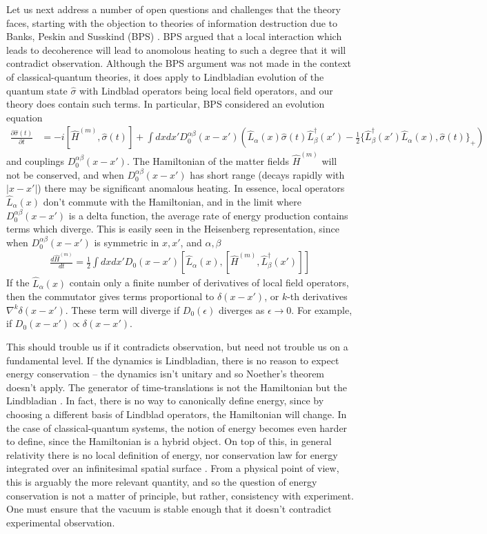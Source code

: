 \documentclass[aps,pra,showpacs,citeautoscript,amsmath,amssymb,floatfix,superscriptaddress,bbm, verbatim,amsfonts,changes,11pt,nofootinbib,longbibliography]{revtex4-2}
\def\L{{\hat{L}}}
\def\qmatterham{\hat{H}^{(m)}}
\def\ab{^{\alpha\beta}}
\def\lax{{\L_\alpha(x)}}
\def\lbxp{{\L^\dagger_\beta(x')}}
\begin{document}
Let us next address a number of open questions and challenges that the theory faces, starting with the objection to theories of information destruction due to Banks, Peskin and Susskind\label{par:bps} (BPS) \cite{bps}. BPS argued
that a local interaction which leads to decoherence will 
lead to anomolous heating to such a degree that it will contradict observation. Although the BPS argument was not made in the context of classical-quantum theories, it does apply to Lindbladian evolution of the quantum state $\hat{\sigma}$ with Lindblad operators being local field operators, and our theory does contain such terms. In particular, BPS considered an evolution equation
\begin{align}
\frac{\partial\hat{\sigma}(t)}{\partial t}
&=-i[\qmatterham,\hat{\sigma}(t)]
+ \int dxdx'
D_0\ab(x-x')\left( 
\L_{\alpha}(x)\hat{\sigma}(t)\L_{\beta}^\dagger(x')
-
\frac{1}{2}\{\lbxp\lax,\hat{\sigma}(t)\}_+ \right)  
\end{align}
 and couplings $D_0\ab(x-x')$.
The Hamiltonian of the matter fields $\qmatterham$ will not be conserved, and when $D_0\ab(x-x')$ has short range (decays rapidly with $|x-x'|$) there may be significant anomalous heating. In essence, local operators $\L_{\alpha}(x)$ don't commute with the Hamiltonian, and in the limit where $D_0\ab(x-x')$ is a delta function, the average rate of energy production contains terms which diverge. This is easily seen in the Heisenberg representation, since when $D_0\ab(x-x')$ is symmetric in $x,x'$, and $\alpha,\beta$ 
\begin{align}
\frac{d{\qmatterham}}{dt} =\frac{1}{2}\int dx dx' D_0(x-x')[\L_{\alpha}(x),[\qmatterham,\L^\dagger_\beta(x')]]
\label{eq:heating}
\end{align} 
If the $\L_{\alpha}(x)$ contain only a finite number of derivatives of local field operators, then the commutator gives terms proportional to $\delta(x-x')$, or $k$-th derivatives $\nabla^k\delta(x-x')$. These term will diverge if $D_0(\epsilon)$ diverges as $\epsilon\rightarrow 0$. For example, if $D_0(x-x')\propto \delta(x-x')$. 

This should trouble us if it contradicts observation, but need not trouble us on a fundamental level. If the dynamics is Lindbladian, there is no reason to expect energy conservation -- the dynamics isn't unitary and so Noether's theorem doesn't apply. The generator of time-translations is not the Hamiltonian but the Lindbladian \cite{Noether_foot}. In fact, there is no way to canonically define energy, since by choosing a different basis of Lindblad operators, the Hamiltonian will change.
In the case of classical-quantum systems, the notion of energy becomes even harder to  define, since the Hamiltonian is a hybrid object. 
On top of this, in general relativity there is no local definition of energy, nor conservation law for energy integrated over an infinitesimal spatial surface \cite{brown1992quasilocal}.  From a physical point of view, this is arguably the more relevant quantity, and so the question of energy conservation is not a matter of principle, but rather, consistency with experiment. 
One must ensure that the vacuum is stable enough that it doesn't contradict experimental observation.
\end{document}
